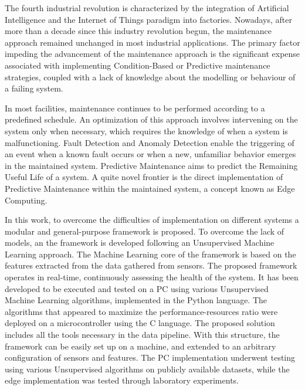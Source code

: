 The fourth industrial revolution is characterized by the integration of Artificial Intelligence and the Internet of Things paradigm into factories. Nowadays, after more than a decade since this industry revolution begun, the maintenance approach remained unchanged in most industrial applications. The primary factor impeding the advancement of the maintenance approach is the significant expense associated with implementing Condition-Based or Predictive maintenance strategies, coupled with a lack of knowledge about the modelling or behaviour of a failing system.

In most facilities, maintenance continues to be performed according to a predefined schedule. An optimization of this approach involves intervening on the system only when necessary, which requires the knowledge of when a system is malfunctioning. Fault Detection and Anomaly Detection enable the triggering of an event when a known fault occurs or when a new, unfamiliar behavior emerges in the maintained system. Predictive Maintenance aims to predict the Remaining Useful Life of a system. A quite novel frontier is the direct implementation of Predictive Maintenance within the maintained system, a concept known as Edge Computing.

In this work, to overcome the difficulties of implementation on different systems a modular and general-purpose framework is proposed. To overcome the lack of models, an the framework is developed following an Unsupervised Machine Learning approach. The Machine Learning core of the framework is based on the features extracted from the data gathered from sensors. The proposed framework operates in real-time, continuously assessing the health of the system. It has been developed to be executed and tested on a PC using various Unsupervised Machine Learning algorithms, implemented in the Python language. The algorithms that appeared to maximize the performance-resources ratio were deployed on a microcontroller using the C language. The proposed solution includes all the tools necessary in the data pipeline. With this structure, the framework can be easily set up on a machine, and extended to an arbitrary configuration of sensors and features. The PC implementation underwent testing using various Unsupervised algorithms on publicly available datasets, while the edge implementation was tested through laboratory experiments.

